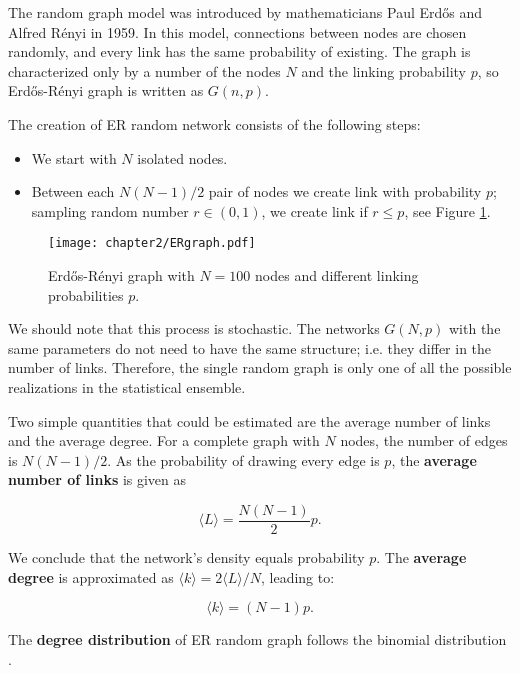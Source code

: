 The random graph model was introduced by mathematicians Paul Erdős and Alfred R\' {e}nyi in 1959. In this model, connections between nodes are chosen randomly, and every link has the same probability of existing. The graph is characterized only by a number of the nodes $N$ and the linking probability $p$, so Erdős-R\' {e}nyi graph is written as $G(n, p)$. 

The creation of ER random network consists of the following steps:
\begin{itemize}
	\item We start with $N$ isolated nodes.
	\item Between each $N(N-1)/2$ pair of nodes we create link with probability $p$; sampling random number $r \in (0,1)$, we create link if $r \leq p$, see Figure \ref{fig:erp}.
\end{itemize}


\begin{figure}[H]
	\centering
	\texttt{[image: chapter2/ERgraph.pdf]}
	\caption[Erdős-R\' {e}nyi graph.]{Erdős-R\' {e}nyi graph with $N=100$ nodes and different linking probabilities $p$.}
	\label{fig:erp}
\end{figure}

We should note that this process is stochastic. The networks $G(N, p)$ with the same parameters do not need to have the same structure; i.e. they differ in the number of links. Therefore, the single random graph is only one of all the possible realizations in the statistical ensemble. 

Two simple quantities that could be estimated are the average number of links and the average degree. For a complete graph with $N$ nodes, the number of edges is $N(N-1)/2$. As the probability of drawing every edge is $p$, the \textbf{average number of links} is given as 

\begin{equation}
\langle L \rangle = \frac{N(N-1)}{2}p.
\end{equation}

We conclude that the network's density equals probability $p$.
The \textbf{average degree} is approximated as $\langle k \rangle = 2 \langle L \rangle / N $, leading to:

\begin{equation}
\langle k \rangle = (N-1)p .
\end{equation}

The \textbf{degree distribution} of ER random graph follows the binomial distribution \cite{barabasi2016network}. 

